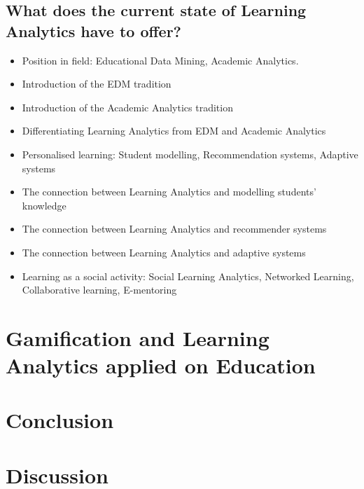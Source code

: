 \documentclass[10pt]{article}
\begin{document}
\subsection{What does the current state of Learning Analytics have to offer?}
\begin{itemize}
\item Position in field: Educational Data Mining, Academic Analytics.
\item Introduction of the EDM tradition
\item Introduction of the Academic Analytics tradition
\item Differentiating Learning Analytics from EDM and Academic Analytics
\item Personalised learning: Student modelling, Recommendation systems, Adaptive systems
\item The connection between Learning Analytics and modelling students’ knowledge
\item The connection between Learning Analytics and recommender systems
\item The connection between Learning Analytics and adaptive systems
\item Learning as a social activity: Social Learning Analytics, Networked Learning, Collaborative learning, E-mentoring
\end{itemize}


\section{Gamification and Learning Analytics applied on Education}

\section{Conclusion}

\section{Discussion}


\pagebreak


\end{document}
